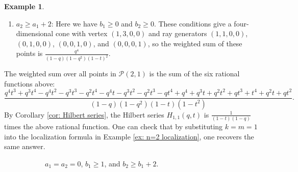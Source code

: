 \documentclass[12pt]{amsart}
\numberwithin{equation}{section}
\theoremstyle{definition}
\newtheorem{example}[theorem]{Example}
\begin{document}
\begin{example}
\begin{enumerate}
\begin{enumerate}
            \item $a_2\geq a_1+2$: Here we have $b_1\geq 0$ and $b_2 \geq 0$. These conditions give a four-dimensional cone with vertex $(1,3,0,0)$ and ray generators $(1,1,0,0)$, $(0,1,0,0)$, $(0,0,1,0)$, and $(0,0,0,1)$, so the weighted sum of these points is $\frac{q^4}{(1-q)(1-q^2)(1-t)^2}$.
        \end{enumerate}
    \end{enumerate}
    The weighted sum over all points in $\mathcal{P}(2,1)$ is the sum of the six rational functions above:
    \[ \frac{q^4t^3 + q^3t^4 - q^4t^2 - q^3t^3 - q^2t^4 - q^4t - q^3t^2 - q^2t^3 - qt^4 + q^4 + q^3t + q^2t^2 + qt^3 + t^4 + q^2t + qt^2}{(1-q)(1-q^2)(1-t)(1-t^2)}.\]
    By Corollary \ref{cor: Hilbert series}, the Hilbert series $H_{1,1}(q,t)$ is $\frac{1}{(1-t)(1-q)}$ times the above rational function.  One can check that by substituting $k=m=1$ into the localization formula in Example \ref{ex: n=2 localization}, one recovers the same answer.
    \begin{figure}[h]
    \begin{subfigure}{.3\textwidth}
    \centering
    \caption{$a_1=a_2=0$, $b_1\geq 1$, and $b_2\geq b_1+2$.}
    \end{subfigure}%
    \hspace{.03\textwidth}
    \begin{subfigure}{.3\textwidth}
    \centering
\end{subfigure}
\end{figure}
\end{example}
\end{document}
